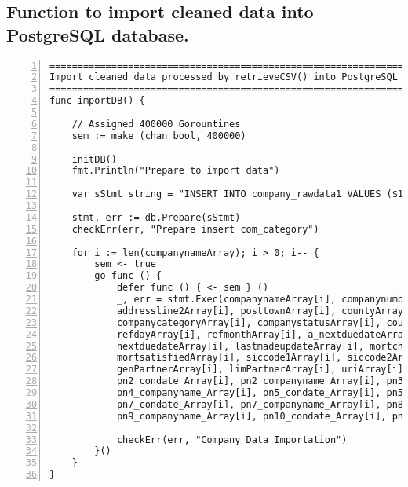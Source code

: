 \subsection{Function to import cleaned data into PostgreSQL database.}
\lstset{basicstyle=\ttfamily\tiny}  
\begin{lstlisting}[breaklines, frame=single, numbers=left, caption={Import cleaned data into PostgreSQL database}, label=commandline-02]
===========================================================================================================
Import cleaned data processed by retrieveCSV() into PostgreSQL database with Semaphore concurrent concepts. 
===========================================================================================================
func importDB() { 

	// Assigned 400000 Gorountines 
	sem := make (chan bool, 400000) 
	
	initDB() 
	fmt.Println("Prepare to import data") 
	
	var sStmt string = "INSERT INTO company_rawdata1 VALUES ($1, $2, $3, $4, $5, $6, $7, $8, $9, $10, $11, $12, $13, $14, $15, $16, $17, $18, $19, $20, $21, $22, $23, $24, $25, $26, $27, $28, $29, $30, $31, $32, $33, $34, $35, $36, $37, $38, $39, $40, $41, $42, $43, $44, $45, $46, $47, $48, $49, $50, $51, $52, $53, $54, $55);"
	
	stmt, err := db.Prepare(sStmt)
	checkErr(err, "Prepare insert com_category")
	
	for i := len(companynameArray); i > 0; i-- {
		sem <- true 
		go func () { 
			defer func () { <- sem } () 
			_, err = stmt.Exec(companynameArray[i], companynumberArray[i], careofArray[i], poboxArray[i], addressline1Array[i], 
			addressline2Array[i], posttownArray[i], countyArray[i], countryArray[i], postcodeArray[i], 
			companycategoryArray[i], companystatusArray[i], countryoforiginArray[i], dissolutiondateArray[i], incorporatedateArray[i], 
			refdayArray[i], refmonthArray[i], a_nextduedateArray[i], a_lastmadeupdateArray[i], accountcategoryArray[i], 
			nextduedateArray[i], lastmadeupdateArray[i], mortchargesArray[i], mortoutstandingArray[i], mortpartsatisfiedArray[i], 
			mortsatisfiedArray[i], siccode1Array[i], siccode2Array[i], siccode3Array[i], siccode4Array[i], 
			genPartnerArray[i], limPartnerArray[i], uriArray[i], pn1_condate_Array[i], pn1_companyname_Array[i], 
			pn2_condate_Array[i], pn2_companyname_Array[i], pn3_condate_Array[i], pn3_companyname_Array[i], pn4_condate_Array[i], 
			pn4_companyname_Array[i], pn5_condate_Array[i], pn5_companyname_Array[i], pn6_condate_Array[i], pn6_companyname_Array[i], 
			pn7_condate_Array[i], pn7_companyname_Array[i], pn8_condate_Array[i], pn8_companyname_Array[i], pn9_condate_Array[i], 
			pn9_companyname_Array[i], pn10_condate_Array[i], pn10_companyname_Array[i], confstmtnextduedateArray[i], confstmtlastmadeupdateArray[i])
			
			checkErr(err, "Company Data Importation")
		}()
	}
}

\end{lstlisting}

